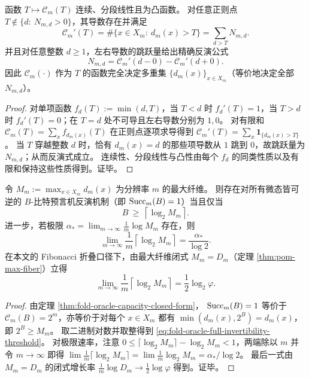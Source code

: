 \begin{proposition}[容量曲线的斜率跳跃完全刻画直方图]\label{prop:fold-oracle-capacity-slope-jumps-determine-histogram}
函数 \(T\mapsto \mathcal{C}_m(T)\) 连续、分段线性且为凸函数。
对任意正则点 \(T\notin\{d:\ N_{m,d}>0\}\)，其导数存在并满足
\[
\boxed{\;
\mathcal{C}_m'(T)=\#\{x\in X_m:\ d_m(x)>T\}
=\sum_{d>T}N_{m,d}.\;}
\]
并且对任意整数 \(d\ge 1\)，左右导数的跳跃量给出精确反演公式
\[
\boxed{\;
N_{m,d}=\mathcal{C}_m'(d-0)-\mathcal{C}_m'(d+0).\;}
\]
因此 \(\mathcal{C}_m(\cdot)\) 作为 \(T\) 的函数完全决定多重集 \(\{d_m(x)\}_{x\in X_m}\)（等价地决定全部 \(N_{m,d}\)）。
\end{proposition}
\begin{proof}
对单项函数 \(f_d(T):=\min(d,T)\)，当 \(T<d\) 时 \(f_d'(T)=1\)，当 \(T>d\) 时 \(f_d'(T)=0\)；在 \(T=d\) 处不可导且左右导数分别为 \(1,0\)。
对有限和 \(\mathcal{C}_m(T)=\sum_x f_{d_m(x)}(T)\) 在正则点逐项求导得到
\(
\mathcal{C}_m'(T)=\sum_x \mathbf 1_{\{d_m(x)>T\}}
\)。
当 \(T\) 穿越整数 \(d\) 时，恰有 \(d_m(x)=d\) 的那些项导数从 \(1\) 跳到 \(0\)，故跳跃量为 \(N_{m,d}\)；从而反演式成立。
连续性、分段线性与凸性由每个 \(f_d\) 的同类性质以及有限和保持这些性质得到。证毕。
\end{proof}



\begin{corollary}[全态可逆的比特阈值与渐近速率]\label{cor:fold-oracle-full-invertibility-threshold}
令
\(
M_m:=\max_{x\in X_m} d_m(x)
\)
为分辨率 \(m\) 的最大纤维。
则存在对所有微态皆可逆的 \(B\)-比特预言机反演机制（即 \({\rm Succ}_m(B)=1\)）当且仅当
\begin{equation}\label{eq:fold-oracle-full-invertibility-threshold}
B\ \ge\ \left\lceil \log_2 M_m\right\rceil.
\end{equation}
进一步，若极限 \(\alpha_*=\lim_{m\to\infty}\frac{1}{m}\log M_m\) 存在，则
\[
\lim_{m\to\infty}\frac{1}{m}\left\lceil \log_2 M_m\right\rceil=\frac{\alpha_*}{\log 2}.
\]
在本文的 Fibonacci 折叠口径下，由最大纤维闭式 \(M_m=D_m\)（定理 \ref{thm:pom-max-fiber}）立得
\[
\lim_{m\to\infty}\frac{1}{m}\left\lceil \log_2 M_m\right\rceil=\frac12\log_2\varphi.
\]
\end{corollary}
\begin{proof}
由定理 \ref{thm:fold-oracle-capacity-closed-form}，
\({\rm Succ}_m(B)=1\) 等价于 \(\mathcal{C}_m(B)=2^m\)，亦等价于对每个 \(x\in X_m\) 都有 \(\min(d_m(x),2^B)=d_m(x)\)，即 \(2^B\ge M_m\)。
取二进制对数并取整得到 \eqref{eq:fold-oracle-full-invertibility-threshold}。
对极限速率，注意
\(
0\le \lceil \log_2 M_m\rceil-\log_2 M_m<1
\)，两端除以 \(m\) 并令 \(m\to\infty\) 即得
\(\lim \frac{1}{m}\lceil \log_2 M_m\rceil=\lim \frac{1}{m}\log_2 M_m=\alpha_*/\log 2\)。
最后一式由 \(M_m=D_m\) 的闭式增长率 \(\frac{1}{m}\log D_m\to \frac12\log\varphi\) 得到。证毕。
\end{proof}

